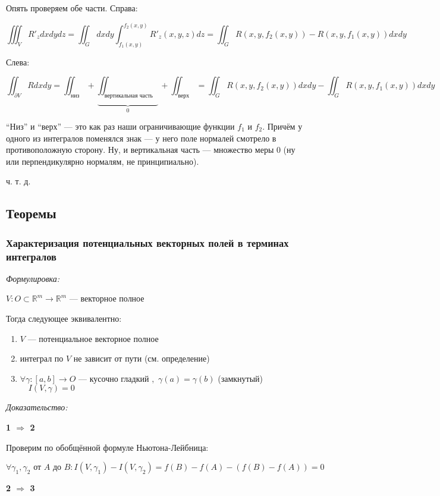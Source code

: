\documentclass{article}
\def\dbl{\,\,}
\begin{document}
Опять проверяем обе части. Справа:

\[\iiint_{V} R'_z dxdydz = \iint_{G} dxdy\int_{f_1(x, y)}^{f_2(x, y)} R'_z(x, y, z) dz = \iint_{G} R(x, y, f_2(x, y)) - R(x, y, f_1(x, y)) dxdy\]

Слева:

\[\iint_{\partial V} R dxdy = \iint_{\text{низ}} + \underbrace{\iint_{\text{вертикальная часть}}}_{0} +  \iint_{\text{верх}} = \iint_{G} R(x, y, f_2(x, y)) dxdy - \iint_{G} R(x, y, f_1(x, y)) dxdy\]

``Низ'' и ``верх'' --- это как раз наши ограничивающие функции $f_1$ и $f_2$. Причём у одного из интегралов поменялся знак --- у него поле нормалей смотрело в противоположную сторону. Ну, и вертикальная часть --- множество меры 0 (ну или перпендикулярно нормалям, не принципиально).

ч. т. д.

\subsection{Теоремы}

\subsubsection{Характеризация потенциальных векторных полей в терминах интегралов}
\textit{Формулировка:}

$V: O \subset \mathbb{R}^m \rightarrow \mathbb{R}^m$ --- векторное полное

Тогда следующее эквивалентно:

\begin{enumerate}
    \item $V$ --- потенциальное векторное полное
    \item интеграл по $V$ не зависит от пути (см. определение)
    \item $\forall \gamma : [a, b] \rightarrow O$ --- кусочно гладкий $, \dbl \gamma(a) = \gamma(b) $ (замкнутый) $ \quad I(V, \gamma) = 0$
\end{enumerate}

\textit{Доказательство:}

\textbf{1 $\Rightarrow$ 2}

Проверим по обобщённой формуле Ньютона-Лейбница:

\[\forall \gamma_1, \gamma_2 \text{ от } A \text{ до } B: I(V, \gamma_1) - I(V, \gamma_2) = f(B) - f(A) - (f(B) - f(A)) = 0\]

\textbf{2 $\Rightarrow$ 3}
\end{document}
